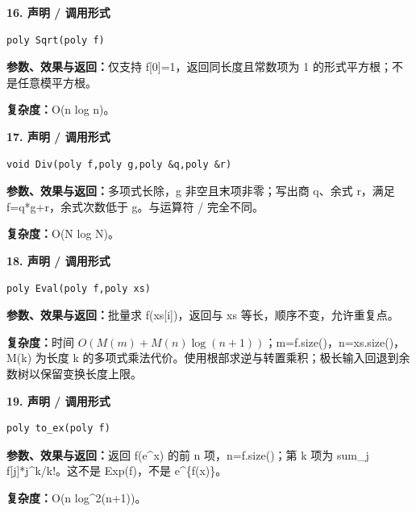 \documentclass[UTF8,a4paper,10pt]{ctexart}
\begin{document}
\noindent\begin{minipage}{\textwidth}
\textbf{16. 声明 / 调用形式}
\begin{lstlisting}
poly Sqrt(poly f)
\end{lstlisting}
\textbf{参数、效果与返回：}仅支持 f[0]=1，返回同长度且常数项为 1 的形式平方根；不是任意模平方根。

\textbf{复杂度：}O(n log n)。

\end{minipage}\par\vspace{0.4em}
\noindent\begin{minipage}{\textwidth}
\textbf{17. 声明 / 调用形式}
\begin{lstlisting}
void Div(poly f,poly g,poly &q,poly &r)
\end{lstlisting}
\textbf{参数、效果与返回：}多项式长除，g 非空且末项非零；写出商 q、余式 r，满足 f=q*g+r，余式次数低于 g。与运算符 / 完全不同。

\textbf{复杂度：}O(N log N)。

\end{minipage}\par\vspace{0.4em}
\noindent\begin{minipage}{\textwidth}
\textbf{18. 声明 / 调用形式}
\begin{lstlisting}
poly Eval(poly f,poly xs)
\end{lstlisting}
\textbf{参数、效果与返回：}批量求 f(xs[i])，返回与 xs 等长，顺序不变，允许重复点。

\textbf{复杂度：}时间 $O(M(m)+M(n)\log(n+1))$；m=f.size()，n=xs.size()，M(k) 为长度 k 的多项式乘法代价。使用根部求逆与转置乘积；极长输入回退到余数树以保留变换长度上限。

\end{minipage}\par\vspace{0.4em}
\noindent\begin{minipage}{\textwidth}
\textbf{19. 声明 / 调用形式}
\begin{lstlisting}
poly to_ex(poly f)
\end{lstlisting}
\textbf{参数、效果与返回：}返回 f(e\textasciicircum{}x) 的前 n 项，n=f.size()；第 k 项为 sum\_j f[j]*j\textasciicircum{}k/k!。这不是 Exp(f)，不是 e\textasciicircum{}\{f(x)\}。

\textbf{复杂度：}O(n log\textasciicircum{}2(n+1))。

\end{minipage}\par\vspace{0.4em}
\end{document}
